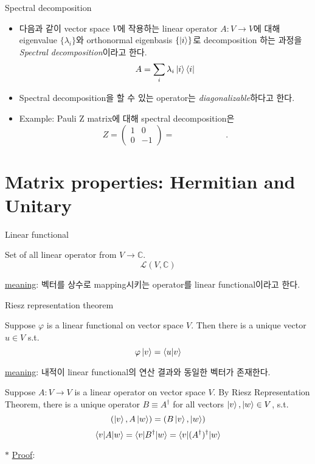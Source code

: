 \documentclass[9pt]{beamer}
\begin{document}
    \begin{frame}{Spectral decomposition}
        \begin{itemize}
            \item 다음과 같이 vector space $V$에 작용하는 linear operator $A: V\rightarrow V$에 대해 eigenvalue $\{\lambda_i\}$와 orthonormal eigenbasis $\{\ket i\}$로 decomposition 하는 과정을 \textit{Spectral decomposition}이라고 한다.
            $$A = \sum_i \lambda_i \ket i \bra i$$
            \item Spectral decomposition을 할 수 있는 operator는 \textit{diagonalizable}하다고 한다.
            \vspace{0.3cm}
            \item Example: Pauli Z matrix에 대해 spectral decomposition은
            $$ Z=\left(\begin{array}{cc} 1 & 0 \\ 0 & -1 \end{array}\right)=\qquad \qquad \qquad .$$
        \end{itemize}
    \end{frame}

    \section{Matrix properties: Hermitian and Unitary}
    \begin{frame}{Linear functional}
        \begin{definition}
            Set of all linear operator from $V \rightarrow \mathbb C$.
            $$\mathcal L(V, \mathbb C)$$
        \end{definition}
        \checkmark \underline{meaning}: 벡터를 상수로 mapping시키는 operator를 linear functional이라고 한다. 
    \end{frame}

    \begin{frame}{Riesz representation theorem}
        \begin{theorem}
            Suppose $\varphi$ is a linear functional on vector space $V$.
            Then there is a unique vector $u \in V$ s.t.
            $$\varphi\ket{v} = \braket{u|v}$$
        \end{theorem}
        \checkmark \underline{meaning}: 내적이 linear functional의 연산 결과와 동일한 벡터가 존재한다.
        \begin{corollary}
            Suppose $A: V \rightarrow V$ is a linear operator on vector space $V$.
            By Riesz Representation Theorem, there is a unique operator $B\equiv A^\dagger$ for all vectors $ \ket v , \ket w \in V$, s.t.
            $$(\ket v, A \ket w) = (B \ket v, \ket w)$$
            $$\braket{v|A|w} = \braket{v|B^\dagger |w} = \braket{v|(A^\dagger)^\dagger|w}$$
        \end{corollary}
        $\ast$ \underline{Proof}:
        \vspace{1.5cm}

    \end{frame}
\end{document}
